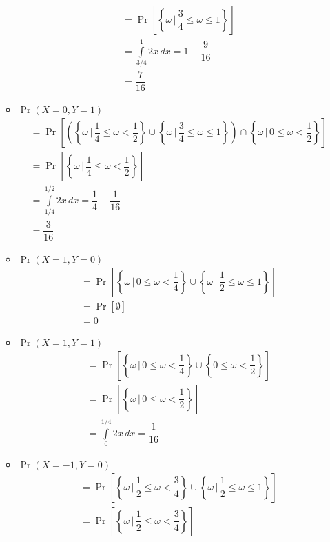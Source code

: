 \documentclass[answers]{exam}
\begin{document}
\begin{questions}
\begin{solution}
\begin{enumerate}[(1)]
\begin{itemize}
\begin{align}
          &= \Pr\left[\left\lbrace \omega\,|\, \dfrac{3}{4}\leq \omega\leq 1\right\rbrace \right]\\
          &= \int\limits_{3/4}^{1}2x\,dx = 1-\dfrac{9}{16}\\
          &= \dfrac{7}{16}
        \end{align}
        \item $\Pr(X=0,Y=1)$
        \begin{align}
          &= \Pr\left[\left(\left\lbrace \omega\,|\, \dfrac{1}{4}\leq\omega <\dfrac{1}{2}\right\rbrace \cup \left\lbrace \omega\,|\, \dfrac{3}{4}\leq \omega \leq 1 \right\rbrace\right)\cap \left\lbrace \omega\,|\, 0\leq \omega< \dfrac{1}{2}\right\rbrace\right]\\
          &= \Pr\left[\left\lbrace \omega\,|\, \dfrac{1}{4}\leq \omega< \dfrac{1}{2}\right\rbrace \right]\\
          &= \int\limits_{1/4}^{1/2}2x\,dx= \dfrac{1}{4}-\dfrac{1}{16}\\
          &= \dfrac{3}{16}
        \end{align}
        \item $\Pr(X=1,Y=0)$
        \begin{align}
          &= \Pr\left[\left\lbrace \omega\,|\,0\leq \omega < \dfrac{1}{4}\right\rbrace \cup \left\lbrace \omega\,|\, \dfrac{1}{2}\leq \omega\leq 1\right\rbrace \right]\\
          &= \Pr\left[\emptyset\right]\\
          &= 0
        \end{align}
        \item $\Pr(X=1,Y=1)$
        \begin{align}
          &= \Pr\left[\left\lbrace \omega\,|\, 0\leq \omega<\dfrac{1}{4}\right\rbrace \cup \left\lbrace 0\leq \omega < \dfrac{1}{2}\right\rbrace \right]\\
          &= \Pr\left[\left\lbrace \omega\,|\,0\leq \omega < \dfrac{1}{2}\right\rbrace\right]\\
          &= \int\limits_{0}^{1/4}2x\,dx = \dfrac{1}{16}
        \end{align}
        \item $\Pr(X=-1,Y=0)$
        \begin{align}
          &= \Pr\left[\left\lbrace \omega\,|\, \dfrac{1}{2}\leq \omega < \dfrac{3}{4}\right\rbrace \cup \left\lbrace \omega\,|\, \dfrac{1}{2}\leq \omega \leq 1 \right\rbrace \right]\\
          &= \Pr\left[\left\lbrace \omega\,|\, \dfrac{1}{2}\leq \omega < \dfrac{3}{4}\right\rbrace \right]\\

\end{align}
\end{itemize}
\end{enumerate}
\end{solution}
\end{questions}
\end{document}
